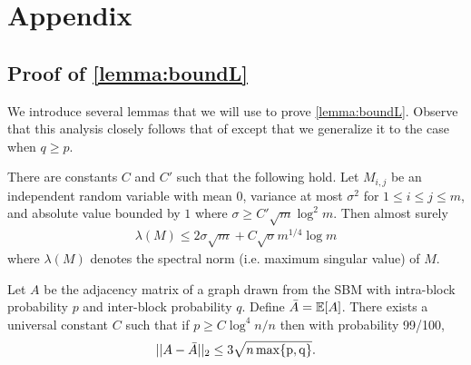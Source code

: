 \appendix
\section{Appendix}

\subsection{Proof of \cref{lemma:boundL}}\label{app:proof}

We introduce several lemmas that we will use to prove
\cref{lemma:boundL}.
Observe that this analysis closely follows that of
\cite{chitra20analyzing} except that we generalize it to
the case when $q\geq p$.

\begin{lemma}\label{lemma:spectral}
    There are constants $C$ and $C'$ such that the following hold.
    Let $M_{i,j}$ be an independent random variable with mean
    0, variance at most $\sigma^2$ for $1 \leq i \leq j \leq m$,
    and absolute value bounded by $1$ where $\sigma \geq C' \sqrt{m} \log^2 m$.
    Then almost surely
    \begin{align}
        \lambda(M) \leq 2 \sigma \sqrt{m}
        + C \sqrt{\sigma} m^{1/4} \log m \nonumber
    \end{align}
    where $\lambda(M)$ denotes the spectral norm
    (i.e. maximum singular value) of $M$.
\end{lemma}

\begin{lemma}\label{lemma:boundA}
    Let $A$ be the adjacency matrix of a graph drawn from the
    SBM with intra-block probability $p$ and inter-block
    probability $q$. Define $\bar{A} = \operatorname*{\mathbb{E}}[A]$.
    There exists a universal constant $C$ such that if
    $p \geq C \log^4 n/n$ then with probability 99/100,
    \begin{align}
        ||A - \bar{A}||_2 \leq 3\sqrt{n \operatorname*{\max \{p, q\}}} \nonumber.
    \end{align}
\end{lemma}

